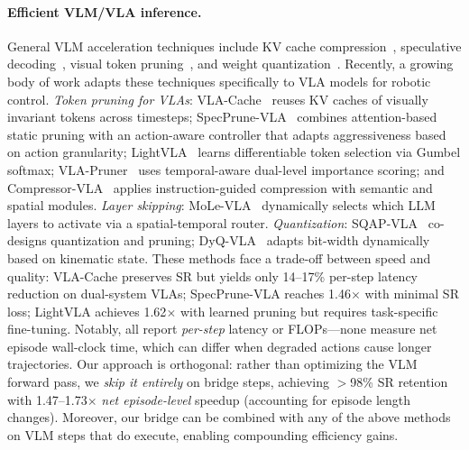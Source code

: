 \documentclass{article}
\begin{document}
\paragraph{Efficient VLM/VLA inference.}
General VLM acceleration techniques include KV cache compression~\cite{li2024snapkv, xiao2024streamingllm}, speculative decoding~\cite{leviathan2023fast, cai2024medusa}, visual token pruning~\cite{chen2024fastv, bolya2022token}, and weight quantization~\cite{lin2024awq, frantar2023gptq}.
Recently, a growing body of work adapts these techniques specifically to VLA models for robotic control.
\emph{Token pruning for VLAs}: VLA-Cache~\cite{xu2025vlacache} reuses KV caches of visually invariant tokens across timesteps; SpecPrune-VLA~\cite{wang2025specprune} combines attention-based static pruning with an action-aware controller that adapts aggressiveness based on action granularity; LightVLA~\cite{lightvla2025} learns differentiable token selection via Gumbel softmax; VLA-Pruner~\cite{vlapruner2025} uses temporal-aware dual-level importance scoring; and Compressor-VLA~\cite{compressorvla2025} applies instruction-guided compression with semantic and spatial modules.
\emph{Layer skipping}: MoLe-VLA~\cite{molevla2025} dynamically selects which LLM layers to activate via a spatial-temporal router.
\emph{Quantization}: SQAP-VLA~\cite{sqapvla2025} co-designs quantization and pruning; DyQ-VLA~\cite{dyqvla2026} adapts bit-width dynamically based on kinematic state.
These methods face a trade-off between speed and quality: VLA-Cache preserves SR but yields only 14--17\% per-step latency reduction on dual-system VLAs; SpecPrune-VLA reaches 1.46$\times$ with minimal SR loss; LightVLA achieves 1.62$\times$ with learned pruning but requires task-specific fine-tuning.
Notably, all report \emph{per-step} latency or FLOPs---none measure net episode wall-clock time, which can differ when degraded actions cause longer trajectories.
Our approach is orthogonal: rather than optimizing the VLM forward pass, we \emph{skip it entirely} on bridge steps, achieving $>$98\% SR retention with 1.47--1.73$\times$ \emph{net episode-level} speedup (accounting for episode length changes).
Moreover, our bridge can be combined with any of the above methods on VLM steps that do execute, enabling compounding efficiency gains.
\end{document}
